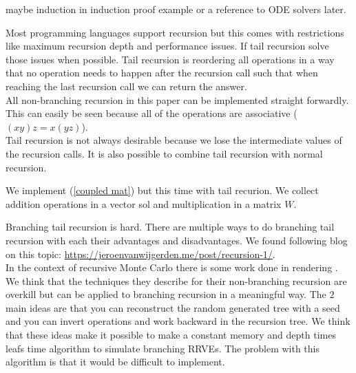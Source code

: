 \documentclass[a4paper,12pt]{article}
\begin{document}
\begin{example}
    maybe induction in induction proof example or a reference to ODE solvers later.
\end{example}

\begin{technique}
    Most programming languages support recursion but this comes with restrictions
    like maximum recursion depth and performance issues. If tail recursion solve those
    issues when possible. Tail recursion is reordering all operations in a way that
    no operation needs to happen after the recursion call such that when reaching
    the last recursion call we can return the answer. \\
    All non-branching recursion
    in this paper can be implemented straight forwardly. This can easily be seen because
    all of the operations are associative ($(xy)z = x(yz)$). \\
    Tail recursion is not always desirable because we lose the intermediate values of the
    recursion calls. It is also possible to combine tail recursion with normal recursion.
\end{technique}

\begin{pythonn}
    We implement (\ref{coupled mat}) but this time with tail recurion.
    We collect addition operations in a vector sol and multiplication
    in a matrix $W$.
    \vspace{0.3cm}
\end{pythonn}


\begin{technique}
    Branching tail recursion is hard. There  are multiple ways to
    do branching tail recursion with each their advantages and disadvantages.
    We found following blog on this topic: \url{https://jeroenvanwijgerden.me/post/recursion-1/}.
    \\
    In the context of recursive Monte Carlo there is some work done in rendering
    \cite{vicini_path_2021}. We think that the techniques they describe for
    their non-branching recursion are overkill but can be applied to branching
    recursion in a meaningful way. The $2$ main ideas are that you can reconstruct
    the random generated tree with a seed and you can invert operations and work backward
    in the recursion tree. We think that these ideas make it possible to make a constant memory and
    depth times leafs time algorithm to simulate branching RRVEs. The problem with
    this algorithm is that it would be difficult to implement.
\end{technique}
\end{document}
